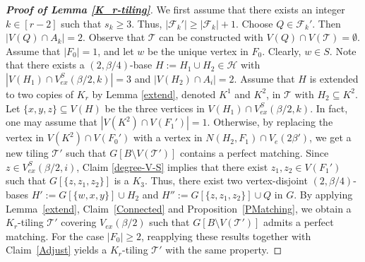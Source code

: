 \documentclass[11pt, a4paper]{article}
\theoremstyle{definition}
\newcommand{\<}{\subseteq}
\begin{document}
\begin{proof}[\bf Proof of Lemma \ref{K_r-tiling}]
 We first assume that there exists an integer $k\in[r-2]$ such that $s_k\ge 3$. Thus, $|\mathcal{F}_k'|\ge |\mathcal{F}_k|+1$. Choose $Q\in \mathcal{F}_k'$. Then $|V(Q)\cap A_k|=2$. Observe that $\mathcal{T}$ can be constructed with  $V(Q)\cap V(\mathcal{T})=\emptyset$. %
Assume that $|F_0|=1$, and let $w$ be the unique vertex in $F_0$. Clearly, $w\in S$.  %
 Note that there exists a $(2, \beta/4)$-base $H:=H_1\cup H_2\in \mathcal{H}$ with $|V(H_1)\cap V_{ex}^S(\beta/2,k)|=3$ and $|V(H_2)\cap A_i|=2$. Assume that $H$ is extended to two copies of $K_r$ by Lemma \ref{extend}, denoted $K^1$ and $K^2$, in $\mathcal{T}$ with $H_2\subseteq K^2$. Let $\{x,y,z\}\subseteq V(H)$ be the three vertices in $V(H_1)\cap V_{ex}^S(\beta/2,k)$. In fact, one may assume that $|V(K^2)\cap V(F_1')|=1$. Otherwise, by replacing the vertex in $V(K^2)\cap V(F_0')$ with a vertex in $N(H_2,F_1)\cap V_e(2\beta')$, we get a new tiling $\mathcal{T}'$ such that $G[B\setminus V(\mathcal{T}')]$ contains a perfect matching. %
 Since $z\in V_{ex}^S(\beta/2,i)$, Claim \ref{degree-V-S} implies that there exist $z_1,z_2\in V(F_1')$ such that $G[\{z,z_1,z_2\}]$ is a $K_3$. %
 Thus, there exist two vertex-disjoint $(2,\beta/4)$-bases $H':=G[\{w,x,y\}]\cup H_2$ and $H'':=G[\{z,z_1,z_2\}]\cup Q$ in $G$. By applying Lemma~\ref{extend}, Claim~\ref{Connected} and Proposition~\ref{PMatching}, we obtain a $K_r$-tiling $\mathcal{T}'$ covering $V_{ex}(\beta/2)$ such that $G[B\setminus V(\mathcal{T}')]$ admits a perfect matching. For the case $|F_0|\geq 2$, reapplying these results together with Claim~\ref{Adjust} yields a $K_r$-tiling $\mathcal{T}'$ with the same property.%


\end{proof}
\end{document}

